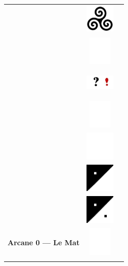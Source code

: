 \documentclass[11pt,oneside,a4paper]{article} %
\newcommand{\colornone}{ \includegraphics[width=1.40cm, height=1.40cm]{../../tarotData/img/color_none.jpg} }
\newcommand{\colorinte}{ \includegraphics[width=1.40cm, height=1.40cm]{../../tarotData/img/color_interrexclam.jpg} }
\newcommand{\tricurve}{ \includegraphics[width=1.40cm, height=1.40cm]{../img/tricurve.jpg} }
\newcommand{\partEmpt}{ \includegraphics[width=1.40cm, height=1.40cm]{../img/CountEmptyPart.png} }
\newcommand{\partHalf}{ \includegraphics[width=1.40cm, height=1.40cm]{../img/CountHalfPart.png} }
\newcommand{\partPlai}{ \includegraphics[width=1.40cm, height=1.40cm]{../img/CountPlainPart.png} }
\begin{document}
\setlength\parindent{0pt} %

\begin{longtable}[ht]{ l l l }

	\Ovalbox{%
		\begin{tabular}[ht]{ @{}m{4.50cm}@{} @{}p{1.50cm}@{} }
			\multirow{ 7 }{4.45cm}{ \includegraphics[width=4.45cm, height=9.00cm]{../../tarotData/img/0_Excuse_LeMat.jpg} \vfill } 
											&	\tricurve		\\
											&	\colornone		\\
											&	\colorinte		\\
											&	\colornone		\\
											&	\partEmpt		\\
											&	\partHalf		\\
											&	\partPlai		\\
			\hline
			\textbf{\footnotesize Arcane 0 --- Le Mat}	&	\colornone		\\
		\end{tabular}
	}	&
	\Ovalbox{%
		\begin{tabular}[ht]{ @{}m{4.50cm}@{} @{}p{1.50cm}@{} }
			\multirow{ 7 }{4.45cm}{ \includegraphics[width=4.45cm, height=9.00cm]{../../tarotData/img/1_LeBateleur_financial.png} \vfill } 

\end{tabular}}
\end{longtable}
\end{document}
